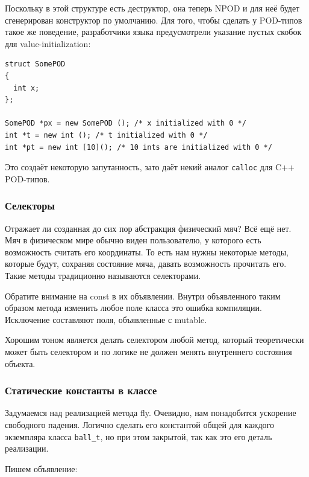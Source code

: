 \documentclass[a4paper,12pt,oneside]{article}
\begin{document}
Поскольку в этой структуре есть деструктор, она теперь NPOD и для неё будет сгенерирован конструктор по умолчанию. Для того, чтобы сделать у POD-типов такое же поведение, разработчики языка предусмотрели указание пустых скобок для value-initialization:

\begin{lstlisting}
struct SomePOD
{
  int x;
};

SomePOD *px = new SomePOD (); /* x initialized with 0 */
int *t = new int (); /* t initialized with 0 */
int *pt = new int [10](); /* 10 ints are initialized with 0 */
\end{lstlisting}

Это создаёт некоторую запутанность, зато даёт некий аналог \lstinline!calloc! для C++ POD-типов. 

\subsubsection{Селекторы}

Отражает ли созданная до сих пор абстракция физический мяч? Всё ещё нет. Мяч в физическом мире обычно виден пользователю, у которого есть возможность считать его координаты. То есть нам нужны некоторые методы, которые будут, сохраняя состояние мяча, давать возможность прочитать его. Такие методы традиционно называются селекторами.



Обратите внимание на const в их объявлении. Внутри объявленного таким образом метода изменить любое поле класса это ошибка компиляции. Исключение составляют поля, объявленные с mutable.

Хорошим тоном является делать селектором любой метод, который теоретически может быть селектором и по логике не должен менять внутреннего состояния объекта.

\subsubsection{Статические константы в классе}

Задумаемся над реализацией метода fly. Очевидно, нам понадобится ускорение свободного падения. Логично сделать его константой общей для каждого экземпляра класса \lstinline!ball_t!, но при этом закрытой, так как это его деталь реализации.

Пишем объявление:


\end{document}
